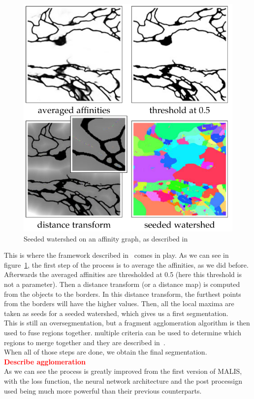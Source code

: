 \begin{figure}[!htbp]
	\centering
	\includegraphics[width=0.5\linewidth]{./images/mala_post_proc.png}
	\caption{Seeded watershed on an affinity graph, as described in~\cite{funke_large_2019}}%
	\label{fig:seeded_ws}
\end{figure}

This is where the framework described in~\cite{funke_large_2019} comes in play.
As we can see in figure~\ref{fig:seeded_ws}, the first step of the process is
to average the affinities, as we did before. Afterwards the averaged affinities
are thresholded at 0.5 (here this threshold is not a parameter). Then a
distance transform (or a distance map) is computed from the objects to the
borders. In this distance transform, the furthest points from the borders will
have the higher values. Then, all the local maxima are taken as seeds for a
seeded watershed, which gives us a first segmentation.\\

This is still an oversegmentation, but a fragment agglomeration algorithm is
then used to fuse regions together. multiple criteria can be used to
determine which regions to merge together and they are described
in~\cite{funke_large_2019}.\\
When all of those steps are done, we obtain the final segmentation.\\

\textbf{\textcolor{red}{Describe agglomeration}}
\\

As we can see the process is greatly improved from the first version of MALIS,
with the loss function, the neural network architecture and the post processign
used being much more powerful than their previous counterparts.
